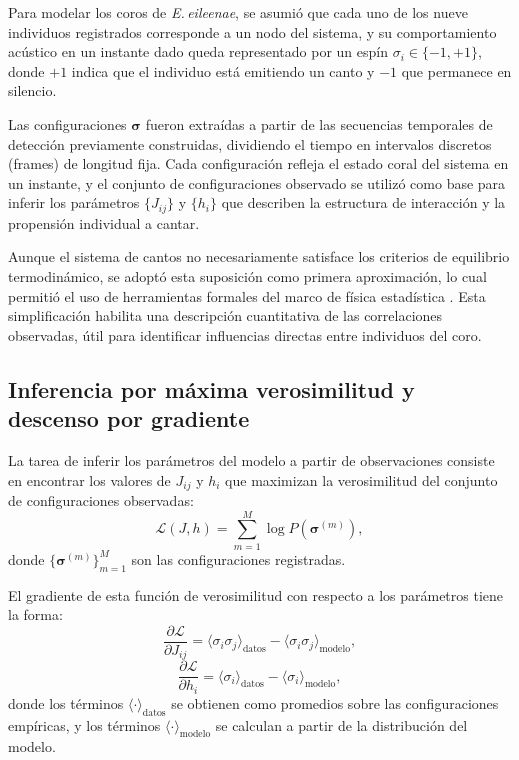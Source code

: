 Para modelar los coros de \emph{E.\,eileenae}, se asumió que 
cada uno de los nueve individuos registrados corresponde a un 
nodo del sistema, y su comportamiento acústico en un instante 
dado queda representado por un espín \( \sigma_i \in \{-1, +1\} \), 
donde \( +1 \) indica que el individuo está emitiendo un canto 
y \( -1 \) que permanece en silencio.

Las configuraciones \(\boldsymbol{\sigma}\) fueron extraídas a 
partir de las secuencias temporales de detección previamente 
construidas, 
dividiendo el tiempo en intervalos discretos (frames) de 
longitud fija. Cada configuración refleja el estado coral del 
sistema en un instante, y el conjunto de configuraciones 
observado se utilizó como base para inferir los parámetros 
\( \{J_{ij}\} \) y \( \{h_i\} \) que describen la estructura de 
interacción y la propensión individual a cantar.

Aunque el sistema de cantos no necesariamente satisface los 
criterios de equilibrio termodinámico, se adoptó esta suposición 
como primera aproximación, lo cual permitió el uso de 
herramientas formales del marco de física estadística 
\cite{zeng2013maximum}. Esta simplificación habilita una 
descripción cuantitativa de las correlaciones observadas, útil 
para identificar influencias directas entre individuos del coro.

\subsection{Inferencia por máxima verosimilitud y descenso por 
gradiente}

La tarea de inferir los parámetros del modelo a partir de 
observaciones consiste en encontrar los valores de \( J_{ij} \) 
y \( h_i \) que maximizan la verosimilitud del conjunto de 
configuraciones observadas:
\[
\mathcal{L}(J, h) = \sum_{m=1}^{M} \log P(\boldsymbol{\sigma}^{(m)}),
\]
donde \( \{\boldsymbol{\sigma}^{(m)}\}_{m=1}^M \) son las 
configuraciones registradas.

El gradiente de esta función de verosimilitud con respecto a los 
parámetros tiene la forma:
\[
\frac{\partial \mathcal{L}}{\partial J_{ij}} = \langle \sigma_i \sigma_j \rangle_{\text{datos}} - \langle \sigma_i \sigma_j \rangle_{\text{modelo}},
\]
\[
\frac{\partial \mathcal{L}}{\partial h_i} = \langle \sigma_i \rangle_{\text{datos}} - \langle \sigma_i \rangle_{\text{modelo}},
\]
donde los términos \( \langle \cdot \rangle_{\text{datos}} \) se 
obtienen como promedios sobre las configuraciones empíricas, y 
los términos \( \langle \cdot \rangle_{\text{modelo}} \) se 
calculan a partir de la distribución del modelo.

